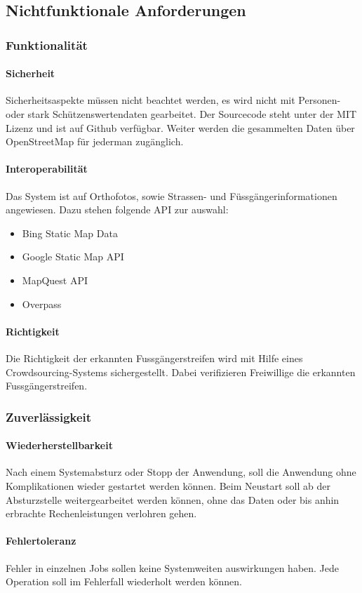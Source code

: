 \subsection{Nichtfunktionale Anforderungen}
\subsubsection{Funktionalität}
\paragraph{Sicherheit}
Sicherheitsaspekte müssen nicht beachtet werden, es wird nicht mit Personen- oder stark Schützenswertendaten gearbeitet. Der Sourcecode steht unter der MIT Lizenz und ist auf Github verfügbar. Weiter werden die gesammelten Daten über OpenStreetMap für jederman zugänglich.
\paragraph{Interoperabilität}
Das System ist auf Orthofotos, sowie Strassen- und Füssgängerinformationen angewiesen.
Dazu stehen folgende API zur auswahl:
\begin{itemize}
	\item Bing Static Map Data
	\item Google Static Map API
	\item MapQuest API
	\item Overpass
\end{itemize}

\paragraph{Richtigkeit}
Die Richtigkeit der erkannten Fussgängerstreifen wird mit Hilfe eines Crowdsourcing-Systems sichergestellt. Dabei verifizieren Freiwillige die erkannten Fussgängerstreifen.
\subsubsection{Zuverlässigkeit}
\paragraph{Wiederherstellbarkeit}
Nach einem Systemabsturz oder Stopp der Anwendung, soll die Anwendung ohne Komplikationen wieder gestartet werden können. Beim Neustart soll ab der Absturzstelle weitergearbeitet werden können, ohne das Daten oder bis anhin erbrachte Rechenleistungen verlohren gehen.
\paragraph{Fehlertoleranz}
Fehler in einzelnen Jobs sollen keine Systemweiten auswirkungen haben. Jede Operation soll im Fehlerfall wiederholt werden können.
